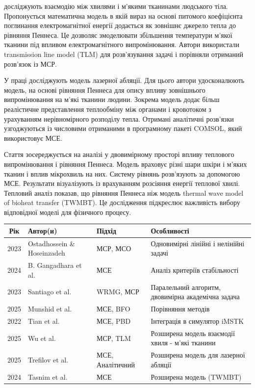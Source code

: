 \cite{transmission_line_model} досліджують взаємодію між хвилями і м'якими тканинами людського тіла. Пропонується 
математична модель в якій вираз на основі питомого коефіцієнта поглинання електромагнітної енергії додається як зовнішнє
джерело тепла до рівняння Пеннеса. Це дозволяє змоделювати збільшення температури м'якої тканини під впливом 
електромагнітного випромінювання. Автори використали transmission line model (TLM) для розв'язування задачі і порівняли 
отриманий розв'язок із МСР.

У праці \cite{trefilov2025generalizedbioheat} досліджують модель лазерної абляції. Для цього автори удосконалюють
модель, на основі рівняння Пеннеса для опису впливу зовнішнього випромінювання на м'які тканини людини. Зокрема модель
додає більш реалістичне представлення теплообміну між органами і кровотоком з урахуванням нерівномірного розподілу 
тепла. Отримані аналітичні розв'язки узгоджуються із числовими отриманими в програмному пакеті COMSOL, який використовує 
МСЕ.

Стаття \cite{tasnim2024thermal} зосереджується на аналізі у двовимірному просторі впливу теплового випромінювання і 
рівняння Пеннеса. Модель враховує різні шари шкіри і м'яких тканин і вплив мікрохвиль на них. Систему рівнянь 
розв'язують за допомогою МСЕ. Результати візуалізують із врахуванням розсіяння енергії теплової хвилі. Тепловий аналіз
показав, що рівняння Пеннеса ніж модель thermal wave model of bioheat transfer (TWMBT). Це дослідження підкреслює 
важливість вибору відповідної моделі для фізичного процесу.   

\begin{center}
  \begin{tabular}{|c|p{3cm}|p{4cm}|p{8cm}|}
    \hline
      \textbf{Рік} & \textbf{Автор(и)} & \textbf{Підхід} & \textbf{Особливості} \\    
    \hline
      2023 & Ostadhossein \& Hoseinzadeh & МСР, МСО & Одновимірні лінійні і нелінійні задачі \\
    \hline
      2024 & B. Gangadhara et al. & МСЕ & Аналіз критеріїв стабільності \\
    \hline
      2023 & Santiago et al. & WRMG, МСР & Паралельний алгоритм, двовимірна академічна задача \\
    \hline
      2025 & Munshid et al. & МСЕ, BFO & Порівняння методів \\
    \hline
      2022 & Tian et al. & МСЕ, PBD & Інтеграція в симулятор iMSTK \\
    \hline
      2025 & Wu et al. & МСР, TLM & Розширена модель взаємодії хвиля - м'які тканини \\
    \hline
      2025 & Trefilov et al. & МСЕ, Аналітичний & Розширена модель для лазерної абляції \\
    \hline
      2024 & Tasnim et al. & МСЕ & Розширена модель (TWMBT) \\
    \hline
  \end{tabular}
\end{center}


